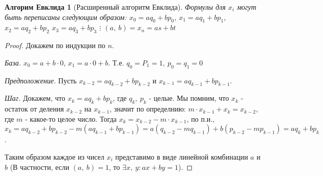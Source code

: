 \documentclass[a4paper,12pt]{article}
\newtheorem*{Evc} {Алгорим Евклида}
\begin{document}
		\begin{Evc}[Расширенный алгоритм Евклида] 
			Формулы для $x_i$ могут быть переписаны следующим образом:
			$x_0 = aq_0 + bp_0$,
			$x_1 = aq_1 + bp_1$,
			$x_2 = aq_2 + bp_2$
			$x_3 = aq_3 + bp_3$
	 		$\vdots$
			$(a,\ b) = x_n = as + bt$
		\end{Evc}
		\begin{proof}
			Докажем по индукции по $n$. 

			\textit{База.} $x_0 = a + b \cdot 0$, $x_1 = a \cdot 0 + b$. Т.е. $q_0 = P_1 = 1,\ p_0 = q_1 = 0$

			\textit{Предположение.} Пусть $x_{k - 2} = aq_{k - 2} + bp_{k - 2}$ и $x_{k - 1} = aq_{k - 1} + bp_{k - 1}$.

			\textit{Шаг.} Докажем, что $x_k = aq_{k} + bp_{k}$, где $q_k,\ p_k$ - целые. Мы помним, что $x_k$ - остаток от деления $x_{k - 2}$ на $x_{k - 1}$, значит по определнию: $m\cdot x_{k - 1} + x_k = x_{k - 2}$, где $m$ - какое-то целое число. Тогда $x_k = x_{k - 2} - m \cdot x_{k - 1}$, по п.и., $x_k = aq_{k - 2} + bp_{k - 2} - m(aq_{k - 1} + bp_{k - 1}) = a(q_{k - 2} - mq_{k - 1}) + b(p_{k - 2} - mp_{k - 1}) = aq_{k} + bp_{k}$.

			Таким образом каждое из чисел $x_i$ представимо в виде линейной комбинации $a$ и $b$ (В частности, если $(a,\ b) = 1$, то $\exists x,\ y: ax + by = 1$).
		\end{proof}
\end{document}
